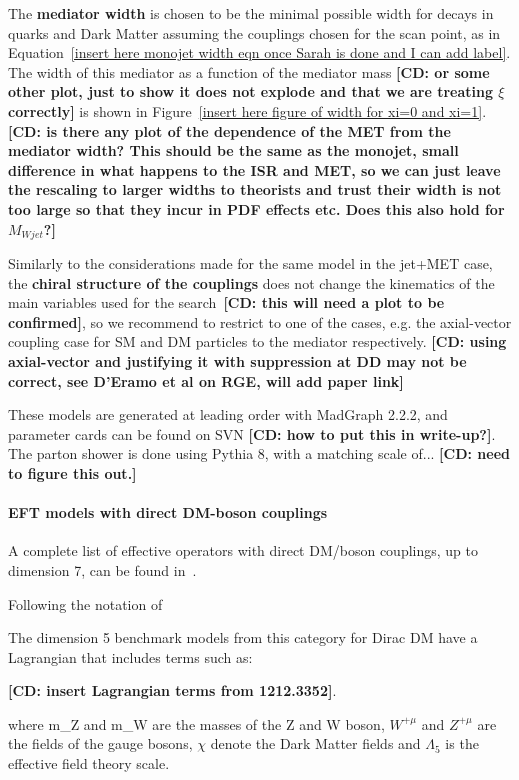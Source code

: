 The \textbf{mediator width} is chosen to be the minimal possible width
for decays in quarks and Dark Matter assuming the couplings chosen
for the scan point, as in Equation~\ref{insert here monojet width eqn once Sarah is done and I can add label}. 
The width of this mediator as a function of the mediator mass 
\textbf{[CD: or some other plot, just to show it does not explode 
and that we are treating $\xi$ correctly]} is shown in Figure~\ref{insert here
figure of width for xi=0 and xi=1}. \textbf{[CD: is there any plot
of the dependence of the MET from the mediator width? This should be the same as the 
monojet, small difference in what happens to the ISR and MET, so we can just leave
the rescaling to larger widths to theorists and trust their width is not too large
so that they incur in PDF effects etc. Does this also hold for $M_{Wjet}$?]}

Similarly to the considerations made for the same model in the jet+MET case, 
the \textbf{chiral structure of the couplings}
does not change the kinematics of the main variables used for the 
search~\textbf{[CD: this will need a plot to be confirmed]}, 
so we recommend to restrict to one of the cases, e.g. the axial-vector coupling case for
SM and DM particles to the mediator respectively. 
\textbf{[CD: using axial-vector and justifying it with suppression at DD may not be
correct, see D'Eramo et al on RGE, will add paper link]}

These models are generated at leading order with MadGraph 2.2.2, and parameter
cards can be found on SVN \textbf{[CD: how to put this in write-up?]}.
The parton shower is done using Pythia 8, with a matching scale of... 
\textbf{[CD: need to figure this out.]}

\paragraph{EFT models with direct DM-boson couplings}

A complete list of effective operators with direct DM/boson couplings, 
up to dimension 7, can be found in~\citep{Cotta:2012nj}. 

Following the notation of



The dimension 5 benchmark models from this category for Dirac DM have a Lagrangian
that includes terms such as:

\textbf{[CD: insert Lagrangian terms from 1212.3352]}. 

where m_Z and m_W are the masses of the Z and W boson, $W^{+\mu}$ and $Z^{+\mu}$
are the fields of the gauge bosons, $\chi$ denote the Dark Matter fields 
and $\Lambda_5$ is the effective field theory scale. 





